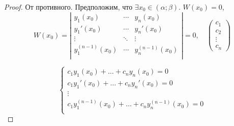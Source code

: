 \documentclass[11pt,a4paper,oneside]{report}
\theoremstyle{definition}
\theoremstyle{plain}
\theoremstyle{remark}
\begin{document}
\begin{proof}
    От противного. Предположим, что $\exists x_0 \in (\alpha;\beta)$. $W(x_0) = 0$,
    \begin{equation*}
        W(x_0) = \left|\begin{array}{ccc}
            y_1(x_0)         & \cdots & y_n(x_0)         \\
            y_1'(x_0)        & \cdots & y_n'(x_0)        \\
            \vdots           & \ddots & \vdots           \\
            y_1^{(n-1)}(x_0) & \cdots & y_n^{(n-1)}(x_0) \\
        \end{array}\right| = 0, \quad \left(\begin{array}{c}
            c_1    \\
            c_2    \\
            \vdots \\
            c_n
        \end{array}\right)
    \end{equation*}

    \begin{equation}\label{eq35}
        \left\{\begin{array}{l}
            c_1y_1(x_0) + \ldots + c_ny_n(x_0) = 0                 \\
            c_1y_1'(x_0) + \ldots + c_ny_n'(x_0) = 0               \\
            \vdots                                                 \\
            c_1y_1^{(n-1)}(x_0) + \ldots + c_ny_n^{(n-1)}(x_0) = 0 \\
        \end{array}\right.
    \end{equation}


\end{proof}
\end{document}
